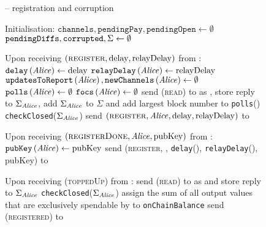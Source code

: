   \begin{figure}[H]
    \begin{systembox}{\fpaynet{} -- registration and corruption}
      \begin{algorithmic}[1]
        \State Initialisation:
        \Indent
          \State $\mathtt{channels}, \mathtt{pendingPay}, \mathtt{pendingOpen}
          \gets \emptyset$
          \State $\redden{\texttt{pendingDiffs}}, \mathtt{corrupted}, \Sigma
          \gets \emptyset$
        \EndIndent
        \Statex

        \State Upon receiving $\left(\textsc{register}, \mathrm{delay},
        \mathrm{relayDelay}\right)$ from \alice:
        \Indent
          \State $\mathtt{delay}\left(\mathit{Alice}\right) \gets \mathrm{delay}$
          \State $\mathtt{relayDelay}\left(\mathit{Alice}\right) \gets
          \mathrm{relayDelay}$
          \State $\mathtt{updatesToReport}\left(\mathit{Alice}\right),
          \mathtt{newChannels}\left(\mathit{Alice}\right) \gets \emptyset$
          \State $\mathtt{polls}\left(\mathit{Alice}\right) \gets \emptyset$
          \State $\mathtt{focs}\left(\mathit{Alice}\right) \gets \emptyset$
          \State send (\textsc{read}) to \ledger{} as \alice{}, store reply to
          $\Sigma_{\mathit{Alice}}$, add $\Sigma_{\mathit{Alice}}$ to $\Sigma$ and add largest
          block number to \texttt{polls}(\alice)
          \label{alg:fpaynet:support:read}
          \State \texttt{checkClosed}($\Sigma_{\mathit{Alice}}$)
          \State send $\left(\textsc{register}, \mathit{Alice}, \mathrm{delay},
          \mathrm{relayDelay}\right)$ to \simulator
        \EndIndent
        \Statex

        \State Upon receiving $\left(\textsc{registerDone}, \mathit{Alice},
        \mathrm{pubKey}\right)$ from \simulator:
        \Indent
          \State $\mathtt{pubKey}\left(\mathit{Alice}\right) \gets \mathrm{pubKey}$
          \State send (\textsc{register}, \alice, \texttt{delay}(\alice),
          \texttt{relayDelay}(\alice), pubKey) to \alice
        \EndIndent
        \Statex

        \State Upon receiving (\textsc{toppedUp}) from \alice:
        \Indent
          \State send (\textsc{read}) to \ledger{} as \alice{} and store reply
          to $\Sigma_{\mathit{Alice}}$
          \State \texttt{checkClosed}($\Sigma_{\mathit{Alice}}$)
          \State assign the sum of all output values that are exclusively
          spendable by \alice{} to \texttt{onChainBalance}
          \State send (\textsc{registered}) to \alice
        \EndIndent
        \Statex


\end{algorithmic}
\end{systembox}
\end{figure}
